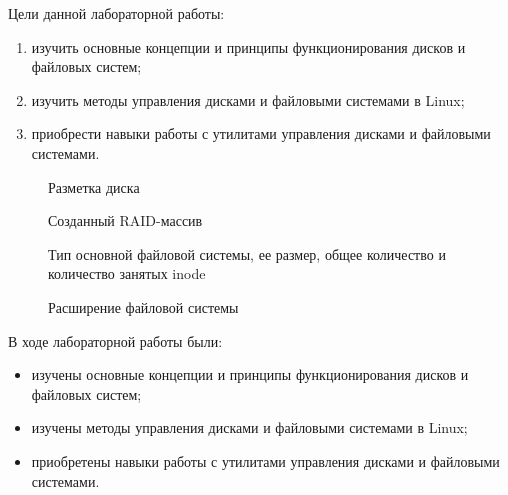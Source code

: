 
Цели данной лабораторной работы:
\begin{enumerate}
	\item изучить основные концепции и принципы функционирования дисков и файловых систем;
	\item изучить методы управления дисками и файловыми системами в Linux;
	\item приобрести навыки работы с утилитами управления дисками и файловыми системами. 
\end{enumerate}



\begin{figure}[!htbp]
	\centering
	\caption{Разметка диска}
\end{figure}
\FloatBarrier


\begin{figure}[!htbp]
	\centering
	\caption{Созданный RAID-массив}
\end{figure}
\FloatBarrier


\begin{figure}[!htbp]
	\centering
	\caption{Тип основной файловой системы, ее размер, общее количество и количество занятых inode}
\end{figure}
\FloatBarrier


\begin{figure}[!htbp]
	\centering
	\caption{Расширение файловой системы}
\end{figure}
\FloatBarrier


В ходе лабораторной работы были:  
\begin{itemize}
	\item изучены основные концепции и принципы функционирования дисков и файловых систем;
	\item изучены методы управления дисками и файловыми системами в Linux;
	\item приобретены навыки работы с утилитами управления дисками и файловыми системами. 
\end{itemize}

